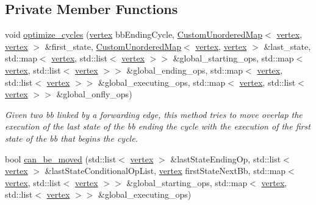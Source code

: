 \subsection*{Private Member Functions}
\begin{DoxyCompactItemize}
\item 
void \hyperlink{classBB__based__stg_a949d51a84f969e119444a89cd98e8d15}{optimize\+\_\+cycles} (\hyperlink{graph_8hpp_abefdcf0544e601805af44eca032cca14}{vertex} bb\+Ending\+Cycle, \hyperlink{custom__map_8hpp_ad1ed68f2ff093683ab1a33522b144adc}{Custom\+Unordered\+Map}$<$ \hyperlink{graph_8hpp_abefdcf0544e601805af44eca032cca14}{vertex}, \hyperlink{graph_8hpp_abefdcf0544e601805af44eca032cca14}{vertex} $>$ \&first\+\_\+state, \hyperlink{custom__map_8hpp_ad1ed68f2ff093683ab1a33522b144adc}{Custom\+Unordered\+Map}$<$ \hyperlink{graph_8hpp_abefdcf0544e601805af44eca032cca14}{vertex}, \hyperlink{graph_8hpp_abefdcf0544e601805af44eca032cca14}{vertex} $>$ \&last\+\_\+state, std\+::map$<$ \hyperlink{graph_8hpp_abefdcf0544e601805af44eca032cca14}{vertex}, std\+::list$<$ \hyperlink{graph_8hpp_abefdcf0544e601805af44eca032cca14}{vertex} $>$$>$ \&global\+\_\+starting\+\_\+ops, std\+::map$<$ \hyperlink{graph_8hpp_abefdcf0544e601805af44eca032cca14}{vertex}, std\+::list$<$ \hyperlink{graph_8hpp_abefdcf0544e601805af44eca032cca14}{vertex} $>$$>$ \&global\+\_\+ending\+\_\+ops, std\+::map$<$ \hyperlink{graph_8hpp_abefdcf0544e601805af44eca032cca14}{vertex}, std\+::list$<$ \hyperlink{graph_8hpp_abefdcf0544e601805af44eca032cca14}{vertex} $>$$>$ \&global\+\_\+executing\+\_\+ops, std\+::map$<$ \hyperlink{graph_8hpp_abefdcf0544e601805af44eca032cca14}{vertex}, std\+::list$<$ \hyperlink{graph_8hpp_abefdcf0544e601805af44eca032cca14}{vertex} $>$$>$ \&global\+\_\+onfly\+\_\+ops)
\begin{DoxyCompactList}\small\item\em Given two bb linked by a forwarding edge, this method tries to move overlap the execution of the last state of the bb ending the cycle with the execution of the first state of the bb that begins the cycle. \end{DoxyCompactList}\item 
bool \hyperlink{classBB__based__stg_afa058ad5484f1872ffe17234aab986b0}{can\+\_\+be\+\_\+moved} (std\+::list$<$ \hyperlink{graph_8hpp_abefdcf0544e601805af44eca032cca14}{vertex} $>$ \&last\+State\+Ending\+Op, std\+::list$<$ \hyperlink{graph_8hpp_abefdcf0544e601805af44eca032cca14}{vertex} $>$ \&last\+State\+Conditional\+Op\+List, \hyperlink{graph_8hpp_abefdcf0544e601805af44eca032cca14}{vertex} first\+State\+Next\+Bb, std\+::map$<$ \hyperlink{graph_8hpp_abefdcf0544e601805af44eca032cca14}{vertex}, std\+::list$<$ \hyperlink{graph_8hpp_abefdcf0544e601805af44eca032cca14}{vertex} $>$$>$ \&global\+\_\+starting\+\_\+ops, std\+::map$<$ \hyperlink{graph_8hpp_abefdcf0544e601805af44eca032cca14}{vertex}, std\+::list$<$ \hyperlink{graph_8hpp_abefdcf0544e601805af44eca032cca14}{vertex} $>$$>$ \&global\+\_\+executing\+\_\+ops)

\end{DoxyCompactItemize}
